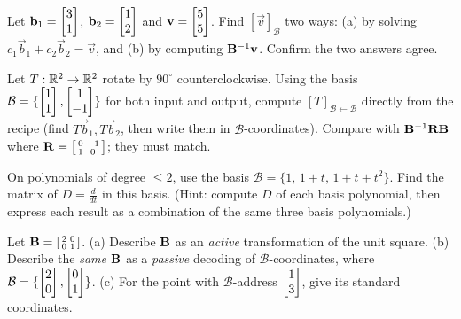 \begin{exercise}
\label{ch31:ex-address}
Let $\mathbf{b}_1=\begin{bmatrix}3\\1\end{bmatrix}$, $\mathbf{b}_2=\begin{bmatrix}1\\2\end{bmatrix}$ and
$\mathbf{v}=\begin{bmatrix}5\\5\end{bmatrix}$. Find $[\vec{v}]_{\mathcal{B}}$ two ways: (a) by solving
$c_1\vec{b}_1+c_2\vec{b}_2=\vec{v}$, and (b) by computing $\mathbf{B}^{-1}\mathbf{v}$.
Confirm the two answers agree.
\end{exercise}

\begin{exercise}
\label{ch31:ex-build}
Let $T:\mathbb{R}^2\to\mathbb{R}^2$ rotate by $90^\circ$ counterclockwise. Using the basis
$\mathcal{B}=\{\begin{bmatrix}1\\1\end{bmatrix},\begin{bmatrix}1\\-1\end{bmatrix}\}$ for both input and output, compute
$[T]_{\mathcal{B}\leftarrow\mathcal{B}}$ directly from the recipe (find $T\vec{b}_1,
T\vec{b}_2$, then write them in $\mathcal{B}$-coordinates). Compare with
$\mathbf{B}^{-1}\mathbf{R}\mathbf{B}$ where $\mathbf{R}=\begin{bsmallmatrix}0&-1\\1&0\end{bsmallmatrix}$;
they must match.
\end{exercise}

\begin{exercise}
\label{ch31:ex-deriv-basis}
On polynomials of degree $\le 2$, use the basis
$\mathcal{B}=\{1,\,1+t,\,1+t+t^2\}$. Find the matrix of $D=\frac{d}{dt}$ in this
basis. (Hint: compute $D$ of each basis polynomial, then express each result as a
combination of the same three basis polynomials.)
\end{exercise}

\begin{exercise}
\label{ch31:ex-active-passive}
Let $\mathbf{B}=\begin{bsmallmatrix}2&0\\0&1\end{bsmallmatrix}$. (a) Describe
$\mathbf{B}$ as an \emph{active} transformation of the unit square. (b) Describe the
\emph{same} $\mathbf{B}$ as a \emph{passive} decoding of $\mathcal{B}$-coordinates,
where $\mathcal{B}=\{\begin{bmatrix}2\\0\end{bmatrix},\begin{bmatrix}0\\1\end{bmatrix}\}$. (c) For the point with
$\mathcal{B}$-address $\begin{bmatrix}1\\3\end{bmatrix}$, give its standard coordinates.
\end{exercise}

